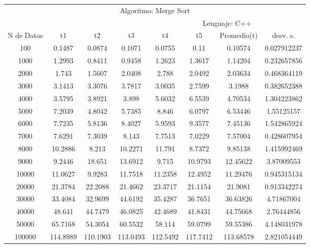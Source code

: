\documentclass{article}
\begin{document}
    \begin{table}[]
        \begin{tabular}{|c|c|c|c|c|c|c|c| }
            \hline
            \multicolumn{8}{c}{Algoritmo: Merge Sort} \\  
            \multicolumn{4}{|c|}{} & \multicolumn{4}{c|}{Lenguaje: C++} \\  
              N de Datos &     t1    &  t2         &  t3          &   t4        &    t5     &   Promedio(t)       & desv. s. \\  
                100	    &0.1487	&0.0874	&0.1071	&0.0755	&0.11	&0.10574	&0.027912237\\  
                1000	&1.2993	&0.8411	&0.9458	&1.2623	&1.3617	&1.14204	&0.232657856\\ \hline
                2000	&1.743	&1.5607	&2.0408	&2.788	&2.0492	&2.03634	&0.468364119\\ \hline
                3000	&3.1413	&3.3076	&3.7817	&3.0035	&2.7599	&3.1988	&0.382652388\\ \hline
                4000	&3.5795	&3.8921	&3.898	&5.6032	&6.5539	&4.70534	&1.304223862\\ \hline
                5000	&7.2039	&4.8042	&5.7385	&8.846	&6.0797	&6.53446	&1.55125157\\ \hline
                6000	&7.7235	&5.8136	&8.4027	&5.9593	&9.3577	&7.45136	&1.542865924\\ \hline
                7000	&7.6291	&7.3039	&8.143	&7.7513	&7.0229	&7.57004	&0.428607954\\ \hline
                8000	&10.2886	&8.213	&10.2271	&11.791	&8.7372	&9.85138	&1.415992469\\ \hline
                9000	&9.2446	&18.651	&13.6912	&9.715	&10.9793	&12.45622	&3.87009553\\ \hline
                10000	&11.0627	&9.9283	&11.7518	&11.2358	&12.4952	&11.29476	&0.945315134\\ \hline
                20000	&21.3784	&22.2088	&21.4662	&23.3717	&21.1154	&21.9081	&0.913342274\\ \hline
                30000	&33.4084	&32.9699	&44.6192	&35.4287	&36.7651	&36.63826	&4.71867004\\ \hline
                40000	&48.641	&44.7479	&46.0825	&42.4689	&41.8431	&44.75668	&2.76444856\\ \hline
                50000	&65.7168	&54.3054	&60.5532	&58.114	&59.0799	&59.55386	&4.148031978\\ \hline
                100000	&114.8989	&110.1903	&113.0493	&112.5492	&117.7412	&113.68578	&2.821054449\\ \hline

\end{tabular}
\end{table}
\end{document}
